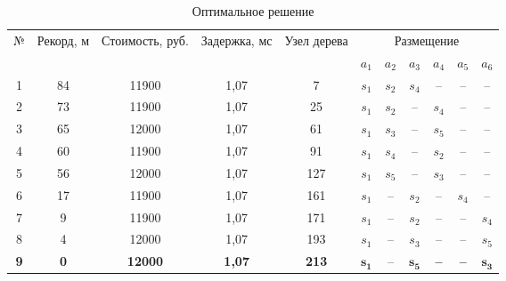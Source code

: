 \begin{table}[h!]\centering
  \begin{tabular}{| c | c | c | c | c | c  c  c  c  c  c |}
    \hline
    \multirow{2}{*}{№} & \multirow{2}{0.1\textwidth}{Рекорд, м} & \multirow{2}{0.15\textwidth}{Стоимость, руб.} & \multirow{2}{0.15\textwidth}{Задержка, мс} & \multirow{2}{0.1\textwidth}{Узел  дерева} & \multicolumn{6}{|c|}{Размещение} \\\cline{6-11}

    &&&&& $a_1$&	$a_2$&	$a_3$&	$a_4$&	$a_5$&	$a_6$\\
    \hline
    1&	84&	11900&	1,07& 7&	$s_1$&	$s_2$&	$s_4$&	--&	--&	-- \\
    2&	73&	11900&	1,07& 25&	$s_1$&	$s_2$&	--&	$s_4$& 	--&	-- \\
    3&	65&	12000&	1,07& 61&	$s_1$&	$s_3$&	--&	$s_5$& 	--&	-- \\
    4&	60&	11900&	1,07& 91&	$s_1$&	$s_4$&	--&	$s_2$& 	--&	-- \\
    5&	56&	12000&	1,07& 127&	$s_1$&	$s_5$&	--&	$s_3$& 	--&	-- \\
    6&	17&	11900&	1,07& 161&	$s_1$&	--&	$s_2$&	--& $s_4$&	-- \\
    7&	9&	11900&	1,07& 171&	$s_1$&	--&	$s_2$&	--& --&	$s_4$ \\
    8&	4&	12000&	1,07& 193&	$s_1$&	--&	$s_3$& 	--& --&	$s_5$ \\
    \hline 
    \textbf{9}&	\textbf{0}&	\textbf{12000}&	\textbf{1,07}& \textbf{213}&	$\mathbf{s_1}$&	--&	$\mathbf{s_5}$& 	\textbf{--}& \textbf{--}&	$\mathbf{s_3}$ \\
    \hline 
    


    \hline
  \end{tabular}\caption{Оптимальное решение}\label{tab:part4_bnb_solution_result}
\end{table}
\normalsize

